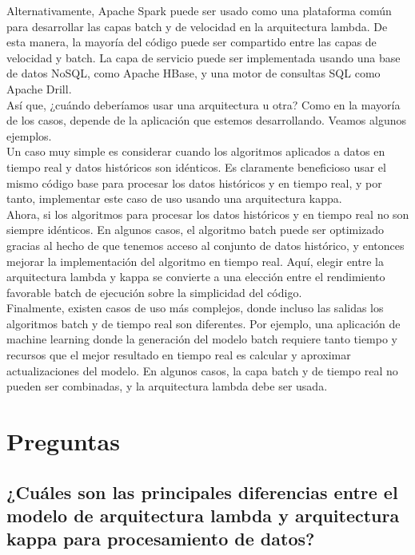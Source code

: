 \documentclass[12pt,a4paper,twoside,openright,titlepage,final]{article}
\begin{document}
Alternativamente, Apache Spark puede ser usado como una plataforma común para desarrollar las capas batch y de velocidad en la arquitectura lambda. De esta manera, la mayoría del código puede ser compartido entre las capas de velocidad y batch. La capa de servicio puede ser implementada usando una base de datos NoSQL, como Apache HBase, y una motor de consultas SQL como Apache Drill.\\

Así que, ¿cuándo deberíamos usar una arquitectura u otra? Como en la mayoría de los casos, depende de la aplicación que estemos desarrollando. Veamos algunos ejemplos.\\

Un caso muy simple es considerar cuando los algoritmos aplicados a datos en tiempo real y datos históricos son idénticos. Es claramente beneficioso  usar el mismo código base para procesar los datos históricos y en tiempo real, y por tanto, implementar este caso de uso usando una arquitectura kappa.\\

Ahora, si los algoritmos para procesar los datos históricos y en tiempo real no son siempre idénticos. En algunos casos, el algoritmo batch puede ser optimizado gracias al hecho de que tenemos acceso al conjunto de datos histórico, y entonces mejorar la implementación del algoritmo en tiempo real. Aquí, elegir entre la arquitectura lambda y kappa se convierte a una elección entre el rendimiento favorable batch de ejecución sobre la simplicidad del código.\\

Finalmente, existen casos de uso más complejos, donde incluso las salidas los algoritmos batch y de tiempo real son diferentes. Por ejemplo, una aplicación de machine learning donde la generación del modelo batch requiere tanto tiempo y recursos que el mejor resultado en tiempo real es calcular y aproximar actualizaciones del modelo. En algunos casos, la capa batch y de tiempo real no pueden ser combinadas, y la arquitectura lambda debe ser usada.

\section{Preguntas}
\subsection{¿Cuáles son las principales diferencias entre el modelo de arquitectura lambda y arquitectura kappa para procesamiento de datos?}
\end{document}
